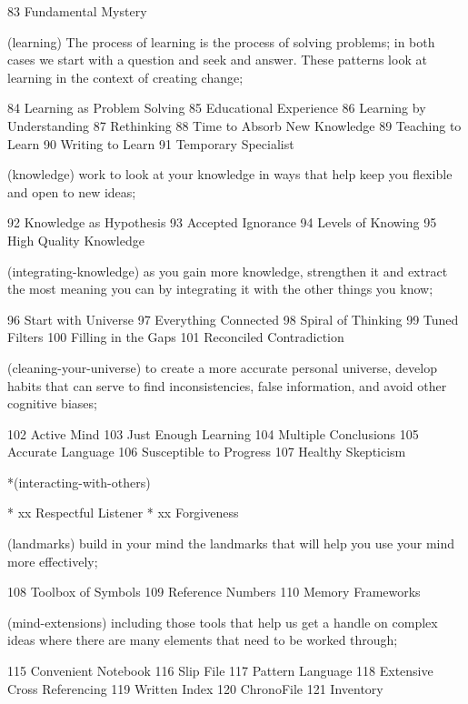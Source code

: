 	83  Fundamental Mystery

(learning) The process of learning is the process of solving problems; in both cases we start with a question and seek and answer. These patterns look at learning in the context of creating change;

	84  Learning as Problem Solving
	85  Educational Experience
	86  Learning by Understanding
	87  Rethinking
	88  Time to Absorb New Knowledge
	89  Teaching to Learn
	90  Writing to Learn
	91  Temporary Specialist

(knowledge) work to look at your knowledge in ways that help keep you flexible and open to new ideas;

	92  Knowledge as Hypothesis
	93  Accepted Ignorance
	94  Levels of Knowing
	95  High Quality Knowledge

(integrating-knowledge) as you gain more knowledge, strengthen it and extract the most meaning you can by integrating it with the other things you know;

	96  Start with Universe
	97  Everything Connected
	98  Spiral of Thinking
	99  Tuned Filters
	100  Filling in the Gaps
	101  Reconciled Contradiction

(cleaning-your-universe) to create a more accurate personal universe, develop habits that can serve to find inconsistencies, false information, and avoid other cognitive biases;

	102  Active Mind
	103  Just Enough Learning
	104  Multiple Conclusions
	105  Accurate Language
	106  Susceptible to Progress
	107  Healthy Skepticism
	
*(interacting-with-others)

*	xx  Respectful Listener   %
*	xx  Forgiveness   %

(landmarks) build in your mind the landmarks that will help you use your mind more effectively;

	108  Toolbox of Symbols
	109  Reference Numbers
	110  Memory Frameworks

(mind-extensions) including those tools that help us get a handle on complex ideas where there are many elements that need to be worked through;

	115  Convenient Notebook
	116  Slip File
	117  Pattern Language
	118  Extensive Cross Referencing
	119  Written Index
	120  ChronoFile
	121  Inventory

